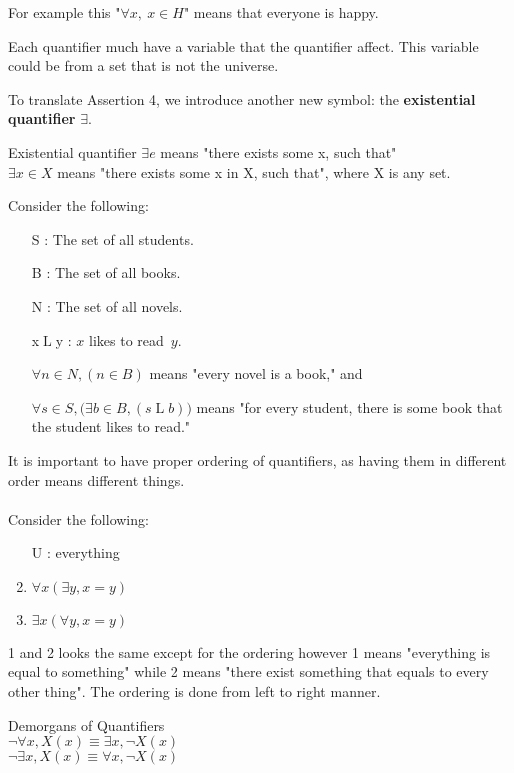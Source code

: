 \documentclass[../MATH-2000-Notes.tex]{subfiles}
\begin{document}
    For example this "\(\forall x,\ x\in H\)" means that everyone is happy.
\begin{Note}
    Each quantifier much have a variable that the quantifier affect. This variable could be from a set that is not the universe.
\end{Note}
To translate Assertion 4, we introduce another new symbol: the \textbf{existential quantifier} \(\exists\).
\begin{Definition}
    {Existential quantifier}
    \(\exists e\) means "there exists some x, such that"\\
    \(\exists x \in X\) means "there exists some x in X, such that", where X is any set.
\end{Definition}
\newpage
Consider the following:
\begin{itemize}
    \item[S]:  The set of all students.
    \item[B]: The set of all books.
    \item[N]: The set of all novels.
    \item[x$\mathrel{L}$y]: $x$ likes to read~$y$.
\end{itemize}
\begin{itemize}
    \item[] $\forall n \in N, (n \in B)$ means "every novel is a book\rlap,"
    and
    \item[] $\forall s \in S, \bigl( \exists b \in B, (s  \mathrel{L} b) \bigr)$ means "for every student, there is some book that the student likes to read\rlap."
\end{itemize}
It is important to have proper ordering of quantifiers, as having them in different order means different things.
\\~\\
Consider the following:
\begin{enumerate}
    \item [U]: everything
    \item \(\forall x(\exists y, x = y)\)
    \item \(\exists x (\forall y, x = y)\)
\end{enumerate}
1 and 2 looks the same except for the ordering however 1 means "everything is equal to something" while 2 means "there exist something that equals to every other thing". The ordering is done from left to right manner.
\begin{Theorem}
    {Demorgans of Quantifiers}~\\
    \(\neg \forall x, X(x) \equiv \exists x, \neg X(x)\)\\
    \(\neg \exists x, X(x) \equiv \forall x, \neg X(x)\)
\end{Theorem}
\end{document}
